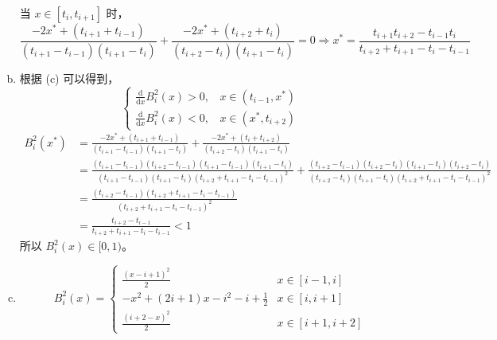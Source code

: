 \documentclass[lang=cn,a4paper,newtx,bibend=bibtex]{elegantpaper}
\begin{document}
\begin{solution}
\begin{enumerate}[(a)]
    当 $x\in [t_{i}, t_{i+1}]$ 时，
    \[
      \frac{-2x^*+(t_{i+1}+t_{i-1})}{(t_{i+1}-t_{i-1})(t_{i+1}-t_i)}+\frac{-2x^*+(t_{i+2}+t_i)}{(t_{i+2}-t_i)(t_{i+1}-t_i)}=0 \Rightarrow x^*=\frac{t_{i+1}t_{i+2}-t_{i-1}t_i}{t_{i+2}+t_{i+1}-t_i-t_{i-1}}
    \]
    \item 根据 (c) 可以得到，
    \begin{equation*}
      \begin{cases}
      \frac{\mathrm{d}}{\mathrm{d}x}B_i^2(x)>0, ~~~~ x\in(t_{i-1},x^*)\\
      \frac{\mathrm{d}}{\mathrm{d}x}B_i^2(x)<0, ~~~~ x\in(x^*,t_{i+2})
      \end{cases}
    \end{equation*}
    \begin{equation*}
    \begin{aligned}
    B_i^2(x^*) &= \frac{-2x^*+(t_{i+1}+t_{i-1})}{(t_{i+1}-t_{i-1})(t_{i+1}-t_i)}+\frac{-2x^*+(t_i+t_{i+2})}{(t_{i+2}-t_{i})(t_{i+1}-t_{i})}\\
    &= \frac{(t_{i+1}-t_{i-1})(t_{i+2}-t_{i-1})(t_{i+1}-t_{i-1})(t_{i+1}-t_i)}{(t_{i+1}-t_{i-1})(t_{i+1}-t_i)(t_{i+2}+t_{i+1}-t_i-t_{i-1})^2} + 
    \frac{(t_{i+2}-t_{i-1})(t_{i+2}-t_{i})(t_{i+1}-t_{i})(t_{i+2}-t_i)}{(t_{i+2}-t_{i})(t_{i+1}-t_i)(t_{i+2}+t_{i+1}-t_i-t_{i-1})^2} \\
    &= \frac{(t_{i+2}-t_{i-1})(t_{i+2}+t_{i+1}-t_i-t_{i-1})}{(t_{i+2}+t_{i+1}-t_i-t_{i-1})^2} \\
    &= \frac{t_{i+2}-t_{i-1}}{t_{i+2}+t_{i+1}-t_i-t_{i-1}} < 1
    \end{aligned}
    \end{equation*}
    所以 $B_i^2(x) \in [0, 1)$。
    \item
    \begin{equation*}
      B_i^2(x) = \begin{cases}
        \frac{(x-i+1)^2}{2} & x\in [i-1, i] \\
        -x^2+(2i+1)x-i^2-i+\frac12 & x\in [i, i+1] \\
        \frac{(i+2-x)^2}{2} & x\in [i+1, i+2]
      \end{cases}
    \end{equation*}


\end{enumerate}
\end{solution}
\end{document}
